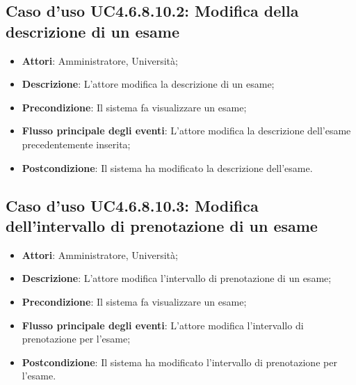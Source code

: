 \subsection{Caso d'uso \texorpdfstring{UC4.6.8.10.2}{UC4.6.8.10.2}: Modifica della descrizione di un esame}
\begin{itemize}
	\item \textbf{Attori}: Amministratore, Università;
	\item \textbf{Descrizione}: L'attore modifica la descrizione di un esame;
	
	\item \textbf{Precondizione}: Il sistema fa visualizzare un esame;
	
	\item \textbf{Flusso principale degli eventi}: L'attore modifica la descrizione dell’esame precedentemente inserita;
	
	\item \textbf{Postcondizione}: Il sistema ha modificato la descrizione dell’esame.
	
\end{itemize}
\subsection{Caso d'uso \texorpdfstring{UC4.6.8.10.3}{UC4.6.8.10.3}: Modifica dell’intervallo di prenotazione di un esame}
\begin{itemize}
	\item \textbf{Attori}: Amministratore, Università;
	\item \textbf{Descrizione}: L'attore modifica l'intervallo di prenotazione di un esame;
	
	\item \textbf{Precondizione}: Il sistema fa visualizzare un esame;
	
	\item \textbf{Flusso principale degli eventi}: L'attore modifica l'intervallo di prenotazione per l’esame;
	
	\item \textbf{Postcondizione}: Il sistema ha modificato l'intervallo di prenotazione per l’esame.
	
\end{itemize}
